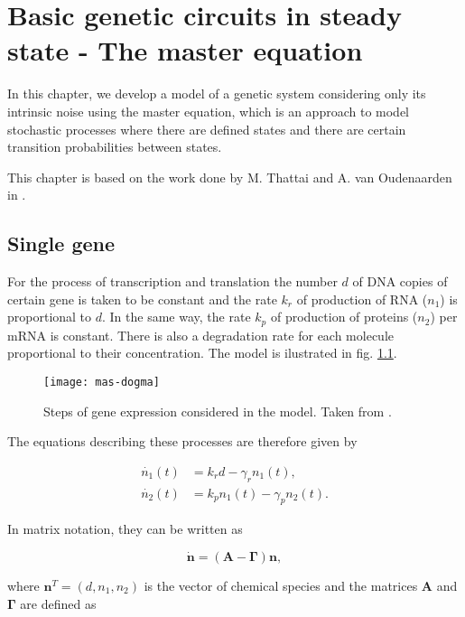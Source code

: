 \chapter{Basic genetic circuits in steady state - The master equation}
\label{ch:master}

In this chapter, we develop a model of a genetic system considering only its intrinsic noise using the master equation, which is an approach to model stochastic processes where there are defined states and there are certain transition probabilities between states.

This chapter is based on the work done by M. Thattai and A. van Oudenaarden in \cite{thattai01}.

\section{Single gene}

For the process of transcription and translation the number $d$ of DNA copies of certain gene is taken to be constant and the rate $k_r$ of production of RNA ($n_1$) is proportional to $d$. In the same way, the rate $k_p$ of production of proteins ($n_2$) per mRNA is constant. There is also a degradation rate for each molecule proportional to their concentration. The model is ilustrated in fig. \ref{fig:mas-dogma}.

\begin{figure}[H]
  \centering
  \texttt{[image: mas-dogma]}
  \caption[Model of gene expression for a single gene]{\label{fig:mas-dogma} Steps of gene expression considered in the model. Taken from \cite{thattai01}.}
\end{figure}

The equations describing these processes are therefore given by

\begin{align}
  \dot{n_1}(t) &= k_rd-\gamma_rn_1(t), \label{eq:1}\\
  \dot{n_2}(t) &= k_pn_1(t)-\gamma_pn_2(t). \label{eq:2}
\end{align}

In matrix notation, they can be written as

\begin{equation}
  \label{eq:matdet}
  \mathbf{\dot{n}} = \left( \mathbf{A} - \mathbf{\Gamma} \right) \mathbf{n},
\end{equation}

where $\mathbf{n}^T=(d,n_1,n_2)$ is the vector of chemical species and the matrices $\mathbf{A}$ and $\mathbf{\Gamma}$ are defined as

